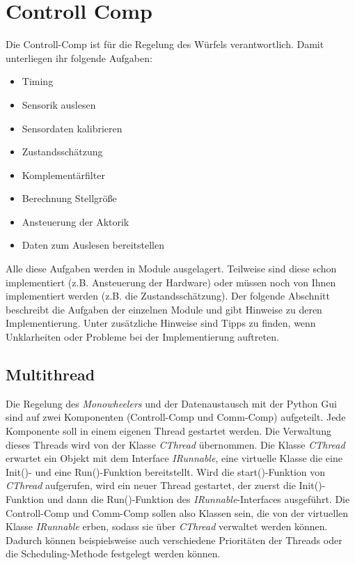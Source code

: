     \section{Controll Comp}
        Die Controll-Comp ist für die Regelung des Würfels verantwortlich. Damit unterliegen ihr folgende Aufgaben:
        \begin{itemize}
            \item Timing
            \item Sensorik auslesen
            \item Sensordaten kalibrieren
            \item Zustandsschätzung
            \item Komplementärfilter
            \item Berechnung Stellgröße
            \item Ansteuerung der Aktorik
            \item Daten zum Auslesen bereitstellen
        \end{itemize}
        Alle diese Aufgaben werden in Module ausgelagert. Teilweise sind diese schon implementiert (z.B. Ansteuerung der Hardware) oder müssen noch von Ihnen implementiert werden (z.B. die Zustandsschätzung). Der folgende Abschnitt beschreibt die Aufgaben der einzelnen Module und gibt Hinweise zu deren Implementierung. Unter zusätzliche Hinweise sind Tipps zu finden, wenn Unklarheiten oder Probleme bei der Implementierung auftreten.

        \subsection{Multithread}
            Die Regelung des \textit{Monowheelers} und der Datenaustausch mit der Python Gui sind auf zwei Komponenten (Controll-Comp und Comm-Comp) aufgeteilt. Jede Komponente soll in einem eigenen Thread gestartet werden. Die Verwaltung dieses Threads wird von der Klasse \textit{CThread} übernommen. Die Klasse \textit{CThread} erwartet ein Objekt mit dem Interface \textit{IRunnable}, eine virtuelle Klasse die eine Init()- und eine Run()-Funktion bereitstellt. Wird die start()-Funktion von \textit{CThread} aufgerufen, wird ein neuer Thread gestartet, der zuerst die Init()- Funktion und dann die Run()-Funktion des \textit{IRunnable}-Interfaces ausgeführt. Die Controll-Comp und Comm-Comp sollen also Klassen sein, die von der virtuellen Klasse \textit{IRunnable} erben, sodass sie über \textit{CThread} verwaltet werden können. Dadurch können beispielsweise auch verschiedene Prioritäten der Threads oder die Scheduling-Methode festgelegt werden können.

